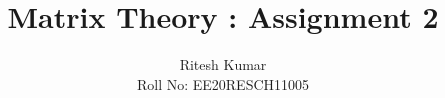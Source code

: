 \documentclass[journal,12pt,twocolumn]{IEEEtran}
\DeclareMathOperator*{\Res}{Res}
\begin{document}
%


\newtheorem{theorem}{Theorem}[section]
\newtheorem{problem}{Problem}
\newtheorem{proposition}{Proposition}[section]
\newtheorem{lemma}{Lemma}[section]
\newtheorem{corollary}[theorem]{Corollary}
\newtheorem{example}{Example}[section]
\newtheorem{definition}[problem]{Definition}

\newcommand{\BEQA}{\begin{eqnarray}}
\newcommand{\EEQA}{\end{eqnarray}}
\newcommand{\define}{\stackrel{\triangle}{=}}

%
\providecommand{\mbf}{\mathbf}
\providecommand{\pr}[1]{\ensuremath{\Pr\left(#1\right)}}
\providecommand{\qfunc}[1]{\ensuremath{Q\left(#1\right)}}
\providecommand{\sbrak}[1]{\ensuremath{{}\left[#1\right]}}
\providecommand{\lsbrak}[1]{\ensuremath{{}\left[#1\right.}}
\providecommand{\rsbrak}[1]{\ensuremath{{}\left.#1\right]}}
\providecommand{\brak}[1]{\ensuremath{\left(#1\right)}}
\providecommand{\lbrak}[1]{\ensuremath{\left(#1\right.}}
\providecommand{\rbrak}[1]{\ensuremath{\left.#1\right)}}
\providecommand{\cbrak}[1]{\ensuremath{\left\{#1\right\}}}
\providecommand{\lcbrak}[1]{\ensuremath{\left\{#1\right.}}
\providecommand{\rcbrak}[1]{\ensuremath{\left.#1\right\}}}
\theoremstyle{remark}
\newtheorem{rem}{Remark}
\newcommand{\sgn}{\mathop{\mathrm{sgn}}}
\providecommand{\abs}[1]{\left\vert#1\right\vert}
\providecommand{\res}[1]{\Res\displaylimits_{#1}} 
\providecommand{\norm}[1]{\left\lVert#1\right\rVert}
\providecommand{\mtx}[1]{\mathbf{#1}}
\providecommand{\mean}[1]{E\left[ #1 \right]}
\providecommand{\fourier}{\overset{\mathcal{F}}{ \rightleftharpoons}}
\providecommand{\system}{\overset{\mathcal{H}}{ \longleftrightarrow}}
\newcommand{\solution}{\noindent \textbf{Solution: }}
\newcommand{\cosec}{\,\text{cosec}\,}
\providecommand{\dec}[2]{\ensuremath{\overset{#1}{\underset{#2}{\gtrless}}}}
\newcommand{\myvec}[1]{\ensuremath{\begin{pmatrix}#1\end{pmatrix}}}
\newcommand{\mydet}[1]{\ensuremath{\begin{vmatrix}#1\end{vmatrix}}}
\makeatletter
{}
\makeatother
\let\StandardTheFigure\thefigure
\let\vec\mathbf
\renewcommand{\thefigure}{\theproblem}
\def\putbox#1#2#3{\makebox[0in][l]{\makebox[#1][l]{}\raisebox{\baselineskip}[0in][0in]{\raisebox{#2}[0in][0in]{#3}}}}
     \def\rightbox#1{\makebox[0in][r]{#1}}
     \def\centbox#1{\makebox[0in]{#1}}
     \def\topbox#1{\raisebox{-\baselineskip}[0in][0in]{#1}}
     \def\midbox#1{\raisebox{-0.5\baselineskip}[0in][0in]{#1}}
\vspace{3cm}
\title{ Matrix Theory : Assignment 2 }
\author{Ritesh Kumar \\ Roll No: EE20RESCH11005}
\end{document}
